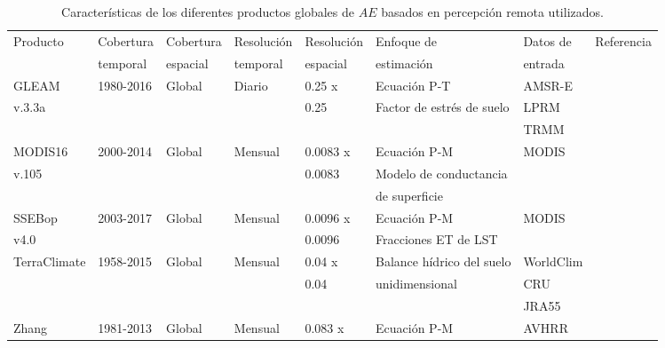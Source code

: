 \begin{sidewaystable}
\caption{\label{tab:ETproducts} Características de los diferentes productos globales de $AE$ basados en percepción remota utilizados.}
\centering
\begin{tabular}{llllllll}
\hline 
Producto     & Cobertura & Cobertura & Resolución & Resolución & Enfoque de                & Datos de   & Referencia      \\
             & temporal  & espacial  & temporal   & espacial   & estimación                & entrada    &                 \\   \hline
GLEAM        & 1980-2016 & Global    & Diario     & 0.25 x     & Ecuación P-T              & AMSR-E     & \citet{Martens2017}     \\
v.3.3a      &           &           &            & 0.25       & Factor de estrés de suelo & LPRM       &                 \\
             &           &           &            &            &                           & TRMM       &                 \\
MODIS16      & 2000-2014 & Global    & Mensual    & 0.0083 x   & Ecuación P-M              & MODIS      & \citet{mu2013modis}         \\
v.105         &           &           &            & 0.0083     & Modelo de conductancia    &            &                 \\
             &           &           &            &            & de superficie             &            &                 \\
SSEBop       & 2003-2017 & Global    & Mensual    & 0.0096 x   & Ecuación P-M              & MODIS      & \citet{senay2011enhancing}      \\
v4.0         &           &           &            & 0.0096     & Fracciones ET de LST      &            &                 \\
TerraClimate & 1958-2015 & Global    & Mensual    & 0.04 x     & Balance hídrico del suelo & WorldClim  & \citet{abatzoglou2018terraclimate} \\
             &           &           &            & 0.04       & unidimensional            & CRU        &                 \\
             &           &           &            &            &                           & JRA55      &                 \\
Zhang        & 1981-2013 & Global    & Mensual    & 0.083 x    & Ecuación P-M              & AVHRR      & \citet{zhang2015vegetation}      \\

\end{tabular}
\end{sidewaystable}
